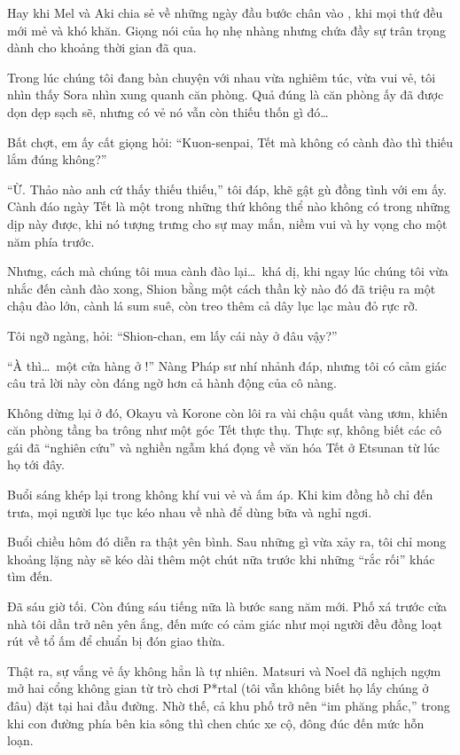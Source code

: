 \documentclass[../main.tex]{subfiles}
\begin{document}
Hay khi Mel và Aki chia sẻ về những ngày đầu bước chân vào \hll, khi mọi thứ đều mới mẻ và khó khăn. Giọng nói của họ nhẹ nhàng nhưng chứa đầy sự trân trọng dành cho khoảng thời gian đã qua.

Trong lúc chúng tôi đang bàn chuyện với nhau vừa nghiêm túc, vừa vui vẻ, tôi nhìn thấy Sora nhìn xung quanh căn phòng. Quả đúng là căn phòng ấy đã được dọn dẹp sạch sẽ, nhưng có vẻ nó vẫn còn thiếu thốn gì đó\dots

Bất chợt, em ấy cất giọng hỏi: ``Kuon-senpai, Tết mà không có cành đào thì thiếu lắm đúng không?''

``Ừ. Thảo nào anh cứ thấy thiếu thiếu,'' tôi đáp, khẽ gật gù đồng tình với em ấy. Cành đáo ngày Tết là một trong những thứ không thể nào không có trong những dịp này được, khi nó tượng trưng cho sự may mắn, niềm vui và hy vọng cho một năm phía trước.

Nhưng, cách mà chúng tôi mua cành đào lại\dots\ khá dị, khi ngay lúc chúng tôi vừa nhắc đến cành đào xong, Shion bằng một cách thần kỳ nào đó đã triệu ra một chậu đào lớn, cành lá sum suê, còn treo thêm cả dây lục lạc màu đỏ rực rỡ.

Tôi ngỡ ngàng, hỏi: ``Shion-chan, em lấy cái này ở đâu vậy?''

``À thì\dots\ một cửa hàng ở !'' Nàng Pháp sư nhí nhảnh đáp, nhưng tôi có cảm giác câu trả lời này còn đáng ngờ hơn cả hành động của cô nàng.

Không dừng lại ở đó, Okayu và Korone còn lôi ra vài chậu quất vàng ươm, khiến căn phòng tầng ba trông như một góc Tết thực thụ. Thực sự, không biết các cô gái đã ``nghiên cứu'' và nghiền ngẫm khá đọng về văn hóa Tết ở Etsunan từ lúc họ tới đây.

Buổi sáng khép lại trong không khí vui vẻ và ấm áp. Khi kim đồng hồ chỉ đến trưa, mọi người lục tục kéo nhau về nhà để dùng bữa và nghỉ ngơi.

Buổi chiều hôm đó diễn ra thật yên bình. Sau những gì vừa xảy ra, tôi chỉ mong khoảng lặng này sẽ kéo dài thêm một chút nữa trước khi những ``rắc rối'' khác tìm đến.

\ct

Đã sáu giờ tối. Còn đúng sáu tiếng nữa là bước sang năm mới. Phố xá trước cửa nhà tôi dần trở nên yên ắng, đến mức có cảm giác như mọi người đều đồng loạt rút về tổ ấm để chuẩn bị đón giao thừa.

Thật ra, sự vắng vẻ ấy không hẳn là tự nhiên. Matsuri và Noel đã nghịch ngợm mở hai cổng không gian từ trò chơi P*rtal (tôi vẫn không biết họ lấy chúng ở đâu) đặt tại hai đầu đường. Nhờ thế, cả khu phố trở nên ``im phăng phắc,'' trong khi con đường phía bên kia sông thì chen chúc xe cộ, đông đúc đến mức hỗn loạn.
\end{document}
